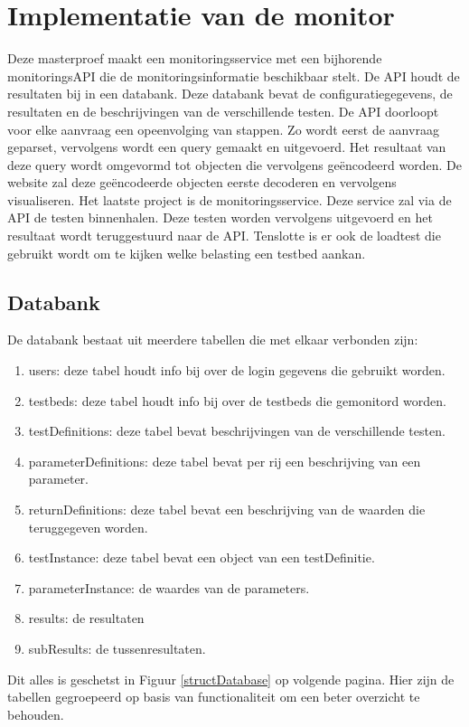 \chapter{Implementatie van de monitor}
{\samenvatting Deze masterproef maakt een monitoringsservice met een bijhorende monitoringsAPI die de monitoringsinformatie beschikbaar stelt. De API houdt de resultaten bij in een databank. Deze databank bevat de configuratiegegevens, de resultaten en de beschrijvingen van de verschillende testen. De API doorloopt voor elke aanvraag een opeenvolging van stappen. Zo wordt eerst de aanvraag geparset, vervolgens wordt een query gemaakt en uitgevoerd. Het resultaat van deze query wordt omgevormd tot objecten die vervolgens ge\"encodeerd worden. De website zal deze ge\"encodeerde objecten eerste decoderen en vervolgens visualiseren. Het laatste project is de monitoringsservice. Deze service zal via de API de testen binnenhalen. Deze testen worden vervolgens uitgevoerd en het resultaat wordt teruggestuurd naar de API. Tenslotte is er ook de loadtest die gebruikt wordt om te kijken welke belasting een testbed aankan.}
\clearpage
\section{Databank}
\npar
De databank bestaat uit meerdere tabellen die met elkaar verbonden zijn:
\begin{enumerate}
\item users: deze tabel houdt info bij over de login gegevens die gebruikt worden.
\item testbeds: deze tabel houdt info bij over de testbeds die gemonitord worden.
\item testDefinitions: deze tabel bevat beschrijvingen van de verschillende testen.
\item parameterDefinitions: deze tabel bevat per rij een beschrijving van een parameter.
\item returnDefinitions: deze tabel bevat een beschrijving van de waarden die teruggegeven worden. 
\item testInstance: deze tabel bevat een object van een testDefinitie.
\item parameterInstance: de waardes van de parameters.
\item results: de resultaten
\item subResults: de tussenresultaten.
\end{enumerate}
\npar
Dit alles is geschetst in Figuur \ref{structDatabase} op volgende pagina. Hier zijn de tabellen gegroepeerd op basis van functionaliteit om een beter overzicht te behouden.
\clearpage

